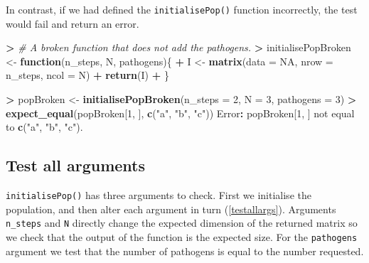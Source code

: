 \documentclass[
]{article}
\newenvironment{Shaded}{\begin{snugshade}}{\end{snugshade}}
\newcommand{\CommentTok}[1]{\textcolor[rgb]{0.56,0.35,0.01}{\textit{#1}}}
\newcommand{\ControlFlowTok}[1]{\textcolor[rgb]{0.13,0.29,0.53}{\textbf{#1}}}
\newcommand{\DataTypeTok}[1]{\textcolor[rgb]{0.13,0.29,0.53}{#1}}
\newcommand{\DecValTok}[1]{\textcolor[rgb]{0.00,0.00,0.81}{#1}}
\newcommand{\ErrorTok}[1]{\textcolor[rgb]{0.64,0.00,0.00}{\textbf{#1}}}
\newcommand{\KeywordTok}[1]{\textcolor[rgb]{0.13,0.29,0.53}{\textbf{#1}}}
\newcommand{\NormalTok}[1]{#1}
\newcommand{\OperatorTok}[1]{\textcolor[rgb]{0.81,0.36,0.00}{\textbf{#1}}}
\newcommand{\OtherTok}[1]{\textcolor[rgb]{0.56,0.35,0.01}{#1}}
\newcommand{\StringTok}[1]{\textcolor[rgb]{0.31,0.60,0.02}{#1}}
\begin{document}
In contrast, if we had defined the \texttt{initialisePop()} function incorrectly, the test would fail and return an error.
\newline
{}\label{testerror}

\begin{Shaded}
\begin{Highlighting}[]
\OperatorTok{>}\StringTok{ }\CommentTok{# A broken function that does not add the pathogens.}
\ErrorTok{>}\StringTok{ }\NormalTok{initialisePopBroken <-}\StringTok{ }\ControlFlowTok{function}\NormalTok{(n_steps, N, pathogens)\{}
\OperatorTok{+}\StringTok{   }\NormalTok{I <-}\StringTok{ }\KeywordTok{matrix}\NormalTok{(}\DataTypeTok{data =} \OtherTok{NA}\NormalTok{, }\DataTypeTok{nrow =}\NormalTok{ n_steps, }\DataTypeTok{ncol =}\NormalTok{ N)}
\OperatorTok{+}\StringTok{   }\KeywordTok{return}\NormalTok{(I)}
\OperatorTok{+}\StringTok{ }\NormalTok{\}}

\OperatorTok{>}\StringTok{ }\NormalTok{popBroken <-}\StringTok{ }\KeywordTok{initialisePopBroken}\NormalTok{(}\DataTypeTok{n_steps =} \DecValTok{2}\NormalTok{, }\DataTypeTok{N =} \DecValTok{3}\NormalTok{, }
                                   \DataTypeTok{pathogens =} \DecValTok{3}\NormalTok{) }
\OperatorTok{>}\StringTok{ }\KeywordTok{expect_equal}\NormalTok{(popBroken[}\DecValTok{1}\NormalTok{, ], }\KeywordTok{c}\NormalTok{(}\StringTok{"a"}\NormalTok{, }\StringTok{"b"}\NormalTok{, }\StringTok{"c"}\NormalTok{))}
\NormalTok{Error}\OperatorTok{:}\StringTok{ }\NormalTok{popBroken[}\DecValTok{1}\NormalTok{, ] not equal to }\KeywordTok{c}\NormalTok{(}\StringTok{"a"}\NormalTok{, }\StringTok{"b"}\NormalTok{, }\StringTok{"c"}\NormalTok{).}
\end{Highlighting}
\end{Shaded}

\hypertarget{testargs}{%
\subsection*{Test all arguments}\label{testargs}}

\texttt{initialisePop()} has three arguments to check.
First we initialise the population, and then alter each argument in turn (\ref{testallargs}).
Arguments \texttt{n\_steps} and \texttt{N} directly change the expected dimension of the returned matrix so we check that the output of the function is the expected size.
For the \texttt{pathogens} argument we test that the number of pathogens is equal to the number requested.
\newline
{}\label{testallargs}
\end{document}
